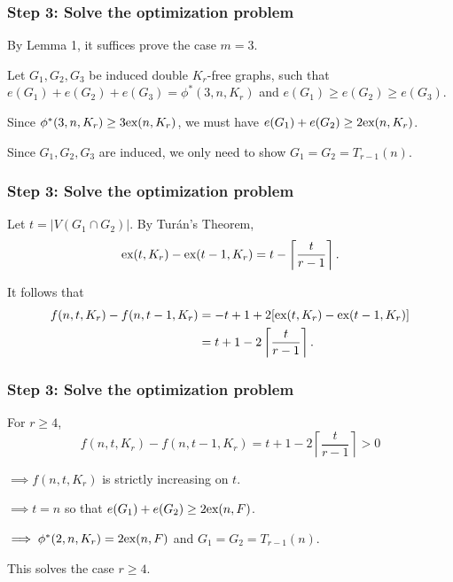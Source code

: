 \documentclass{beamer}
\newcommand*{\ex}{\textnormal{ex}}
\begin{document}
\begin{frame}
  \frametitle{Step 3: Solve the optimization problem}

  By Lemma 1, it suffices prove the case $m = 3$. 

  \pause

  \vspace{0.6cm}

  Let $G_1, G_2, G_3$ be induced double $K_r$-free graphs, such that $e(G_1) + e(G_2) + e(G_3) = \phi^*(3, n, K_r)$ and $e(G_1) \geq e(G_2) \geq e(G_3)$.

  \pause

  \vspace{0.6cm}

  Since $\phi^*(3, n, K_r) \geq 3\ex(n, K_r)$, we must have $e(G_1) + e(G_2) \geq 2\ex(n, K_r)$.

  \pause

  \vspace{0.6cm}

  Since $G_1, G_2, G_3$ are induced, we only need to show $G_1 = G_2 = T_{r - 1}(n)$.
\end{frame}

\begin{frame}
  \frametitle{Step 3: Solve the optimization problem}

  Let $t = |V(G_1 \cap G_2)|$. By Turán's Theorem,
  \[
    \ex(t, K_{r}) - \ex(t - 1, K_{r}) = t - \left\lceil \frac{t}{r - 1} \right\rceil.
  \]

  \pause

  \vspace{0.5cm}

  It follows that
  \begin{align}
    f(n, t, K_r) - f(n, t - 1, K_r)
    &= - t + 1 + 2[\ex(t, K_r) - \ex(t - 1, K_r)] \notag \\
    &= t + 1 - 2\left\lceil \frac{t}{r - 1} \right\rceil. 
  \end{align}
\end{frame}

\begin{frame}
  \frametitle{Step 3: Solve the optimization problem}

  For $r \geq 4$,
  \[
    f(n, t, K_r) - f(n, t - 1, K_r) = t + 1 - 2\left\lceil \frac{t}{r - 1} \right\rceil > 0
  \]

  \pause

  \vspace{0.5cm}

  $\implies f(n, t, K_r)$ is strictly increasing on $t$.

  \pause

  \vspace{0.5cm}

  $\implies t = n$ so that $e(G_1) + e(G_2) \geq 2\ex(n, F)$.

  \pause

  \vspace{0.5cm}

  $\implies \phi^*(2, n, K_r) = 2\ex(n, F)$ and $G_1 = G_2 = T_{r - 1}(n)$.

  \vspace{0.5cm}

  This solves the case $r \geq 4$.
\end{frame}
\end{document}
